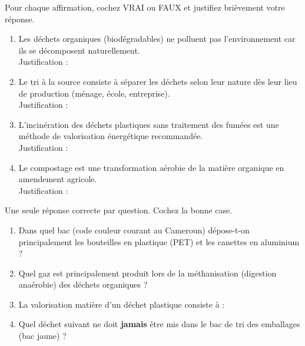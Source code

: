 \documentclass[11pt]{article}
\begin{document}
\begin{exercice}
Pour chaque affirmation, cochez VRAI ou FAUX et justifiez brièvement votre réponse.
\begin{enumerate}
    \item Les déchets organiques (biodégradables) ne polluent pas l'environnement car ils se décomposent naturellement. \quad {} \quad {} \\
    Justification : \dotfill
    \item Le tri à la source consiste à séparer les déchets selon leur nature dès leur lieu de production (ménage, école, entreprise). \quad {} \quad {} \\
    Justification : \dotfill
    \item L'incinération des déchets plastiques sans traitement des fumées est une méthode de valorisation énergétique recommandée. \quad {} \quad {} \\
    Justification : \dotfill
    \item Le compostage est une transformation aérobie de la matière organique en amendement agricole. \quad {} \quad {} \\
    Justification : \dotfill
\end{enumerate}
\end{exercice}

\begin{exercice}
Une seule réponse correcte par question. Cochez la bonne case.
\begin{enumerate}
    \item Dans quel bac (code couleur courant au Cameroun) dépose-t-on principalement les bouteilles en plastique (PET) et les canettes en aluminium ?
    \quad {} \quad {} \quad {} \quad {}
    \item Quel gaz est principalement produit lors de la méthanisation (digestion anaérobie) des déchets organiques ?
    \quad {} \quad {} \quad {} \quad {}
    \item La valorisation matière d'un déchet plastique consiste à :
    \quad {} \quad {} \quad {} \quad {}
    \item Quel déchet suivant ne doit \textbf{jamais} être mis dans le bac de tri des emballages (bac jaune) ?
    \quad {} \quad {} \quad {} \quad {}
\end{enumerate}
\end{exercice}
\end{document}
